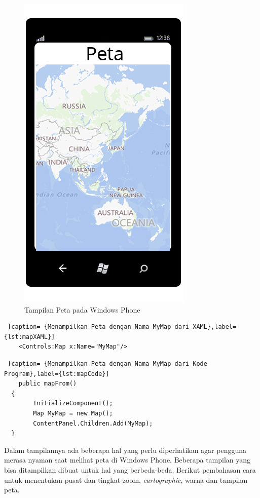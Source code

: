 \begin{figure}[h]
	\centering
		\includegraphics[scale=0.1]{Gambar/map}
	\caption{Tampilan Peta pada Windows Phone}
	\label{fig:peta}
\end{figure}

\begin{lstlisting} [caption= {Menampilkan Peta dengan Nama MyMap dari XAML},label={lst:mapXAML}]
	<Controls:Map x:Name="MyMap"/>
\end{lstlisting}

\begin{lstlisting} [caption= {Menampilkan Peta dengan Nama MyMap dari Kode Program},label={lst:mapCode}]
	public mapFrom()
  {
		InitializeComponent();
		Map MyMap = new Map();
		ContentPanel.Children.Add(MyMap);
  }
\end{lstlisting}

\hspace{0.5cm} Dalam tampilannya ada beberapa hal yang perlu diperhatikan agar pengguna merasa nyaman saat melihat peta di Windows Phone. Beberapa tampilan yang bisa ditampilkan dibuat untuk hal yang berbeda-beda. Berikut pembahasan cara untuk menentukan pusat dan tingkat zoom, \textit{cartographic}, warna dan tampilan peta.

